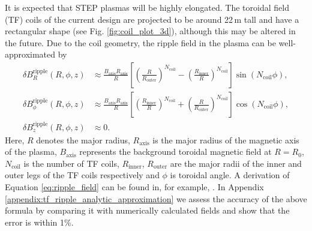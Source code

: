 \documentclass[10pt, a4paper, twoside]{article}
\begin{document}
It is expected that STEP plasmas will be highly elongated. The toroidal field (TF) coils of the current design are projected to be around 22\,m tall and have a rectangular shape (see Fig. \ref{fig:coil_plot_3d}), although this may be altered in the future. Due to the coil geometry, the ripple field in the plasma can be well-approximated by
\begin{equation}
    \label{eq:ripple_field}
    \begin{aligned}
        \delta B_R^{\text{ripple}}(R, \phi, z) &\approx \frac{B_\text{axis} R_\text{axis}}{R}\left[\left(\frac{R}{R_{\text{outer}}}\right)^{N_\text{coil}}-\left(\frac{R_\text{inner}}{R}\right)^{N_\text{coil}}\right]\sin(N_{\text{coil}}\phi), \\
        \delta B_\phi^{\text{ripple}}(R, \phi, z) &\approx \frac{B_\text{axis} R_\text{axis}}{R}\left[\left(\frac{R_\text{inner}}{R}\right)^{N_\text{coil}} + \left(\frac{R}{R_{\text{outer}}}\right)^{N_\text{coil}}\right]\cos(N_{\text{coil}}\phi),\\
        \delta B_z^{\text{ripple}}(R, \phi, z) &\approx 0.
    \end{aligned}
\end{equation}
Here, $R$ denotes the major radius, $R_\text{axis}$ is the major radius of the magnetic axis of the plasma, $B_\text{axis}$ represents the background toroidal magnetic field at $R=R_0$, $N_{\text{coil}}$ is the number of TF coils, $R_\text{inner}$, $R_\text{outer}$ are the major radii of the inner and outer legs of the TF coils respectively and $\phi$ is toroidal angle. A derivation of Equation \eqref{eq:ripple_field} can be found in, for example, \cite{mcclements2005}. In Appendix \ref{appendix:tf_ripple_analytic_approximation} we assess the accuracy of the above formula by comparing it with numerically calculated fields and show that the error is within 1\%.
\end{document}
